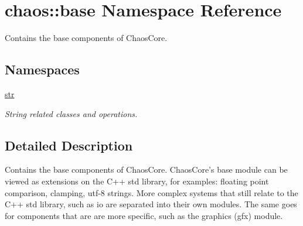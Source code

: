 \hypertarget{namespacechaos_1_1base}{\section{chaos\-:\-:base Namespace Reference}
\label{namespacechaos_1_1base}
}


Contains the base components of Chaos\-Core.  


\subsection*{Namespaces}
\begin{DoxyCompactItemize}
\item 
\hyperlink{namespacechaos_1_1base_1_1str}{str}
\begin{DoxyCompactList}\small\item\em String related classes and operations. \end{DoxyCompactList}\end{DoxyCompactItemize}


\subsection{Detailed Description}
Contains the base components of Chaos\-Core. Chaos\-Core's base module can be viewed as extensions on the C++ std library, for examples\-: floating point comparison, clamping, utf-\/8 strings. More complex systems that still relate to the C++ std library, such as io are separated into their own modules. The same goes for components that are are more specific, such as the graphics (gfx) module. 